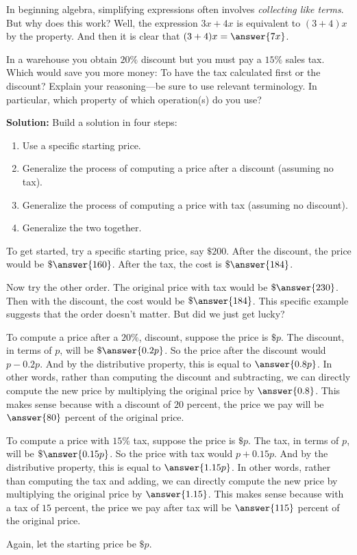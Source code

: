 \documentclass[nooutcomes]{ximera}
\begin{document}
\begin{problem}
In beginning algebra, simplifying expressions often involves \textit{collecting like terms}.  But why does this work?  Well, the expression $3x+4x$ is equivalent to $(3+4)x$ by the  property.  And then it is clear that $(3+4)x = \answer{7x}$. \end{problem}

\begin{problem}In a warehouse you obtain $20\%$ discount but you must pay a
  $15\%$ sales tax. Which would save you more money: To have the tax
  calculated first or the discount? Explain your reasoning---be sure
  to use relevant terminology.  In particular, which property 
of which operation(s) do you use?  

\textbf{Solution:}  Build a solution in four steps: 
\begin{enumerate}
\item Use a specific starting price. 
\item Generalize the process of computing a price after a discount (assuming no tax).  
\item Generalize the process of computing a price with tax (assuming no discount). 
\item Generalize the two together. 
\end{enumerate}

To get started, try a specific starting price, say $\$200$.  After the discount, the price would be $\$\answer{160}$.  After the tax, the cost is $\$\answer{184}$.  

Now try the other order.  The original price with tax would be $\$\answer{230}$.  Then with the discount, the cost would be $\$\answer{184}$.  This specific example suggests that the order doesn't matter.  But did we just get lucky?  

\begin{problem}
To compute a price after a $20\%$, discount, suppose the price is $\$p$.  The discount, in terms of $p$, will be $\$\answer{0.2p}$.  So the price after the discount would $p - 0.2p$.  And by the distributive property, this is equal to $\answer{0.8p}$.  In other words, rather than computing the discount and subtracting, we can directly compute the new price by multiplying the original price by $\answer{0.8}$.  This makes sense because with a discount of $20$ percent, the price we pay will be $\answer{80}$ percent of the original price.  
\begin{problem}
To compute a price with $15\%$ tax, suppose the price is $\$p$.  The tax, in terms of $p$, will be $\$\answer{0.15p}$.  So the price with tax would $p + 0.15p$.  And by the distributive property, this is equal to $\answer{1.15p}$.  In other words, rather than computing the tax and adding, we can directly compute the new price by multiplying the original price by $\answer{1.15}$.  This makes sense because with a tax of $15$ percent, the price we pay after tax will be $\answer{115}$ percent of the original price.  
\begin{problem}
Again, let the starting price be $\$p$.  


\end{problem}
\end{problem}
\end{problem}
\end{problem}
\end{document}
